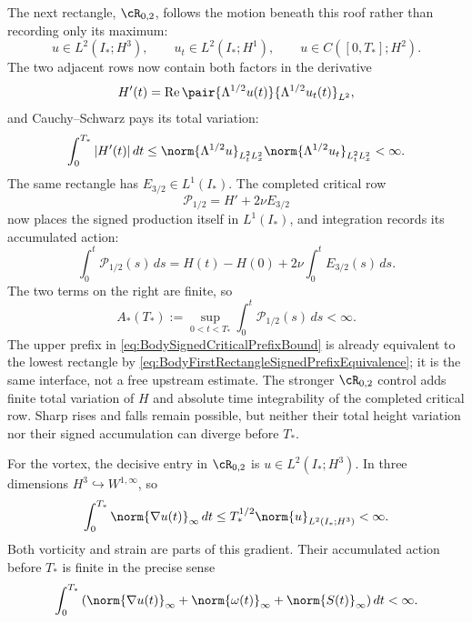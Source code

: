 The next rectangle, \(\cR_{0,2}\), follows the motion beneath this roof rather
than recording only its maximum:
\begin{equation}\label{eq:LowRectangleZeroTwo}
  u\in L^2(I_*;H^3),
  \qquad
  u_t\in L^2(I_*;H^1),
  \qquad
  u\in C([0,T_*];H^2).
\end{equation}
The two adjacent rows now contain both factors in the derivative
\[
  H'(t)
  =\operatorname{Re}
  \pair{\Lambda^{1/2}u(t)}{\Lambda^{1/2}u_t(t)}_{L^2},
\]
and Cauchy--Schwarz pays its total variation:
\begin{equation}\label{eq:CriticalHeightTotalVariationBound}
  \int_0^{T_*}|H'(t)|\,dt
  \leq
  \norm{\Lambda^{1/2}u}_{L^2_tL^2_x}
  \norm{\Lambda^{1/2}u_t}_{L^2_tL^2_x}
  <\infty.
\end{equation}
The same rectangle has \(E_{3/2}\in L^1(I_*)\).  The completed critical row
\[
  \mathcal P_{1/2}=H'+2\nu E_{3/2}
\]
now places the signed production itself in \(L^1(I_*)\), and integration
records its accumulated action:
\begin{equation}\label{eq:BodySignedCriticalPrefix}
  \int_0^t\mathcal P_{1/2}(s)\,ds
  =H(t)-H(0)+2\nu\int_0^tE_{3/2}(s)\,ds.
\end{equation}
The two terms on the right are finite, so
\begin{equation}\label{eq:BodySignedCriticalPrefixBound}
  A_*(T_*)
  :=\sup_{0<t<T_*}\int_0^t\mathcal P_{1/2}(s)\,ds
  <\infty.
\end{equation}
The upper prefix in \eqref{eq:BodySignedCriticalPrefixBound} is already
equivalent to the lowest rectangle by
\eqref{eq:BodyFirstRectangleSignedPrefixEquivalence}; it is the same interface,
not a free upstream estimate.  The stronger \(\cR_{0,2}\) control adds finite
total variation of \(H\) and absolute time integrability of the completed
critical row.  Sharp rises and falls remain possible, but neither their total
height variation nor their signed accumulation can diverge before \(T_*\).

For the vortex, the decisive entry in \(\cR_{0,2}\) is
\(u\in L^2(I_*;H^3)\).  In three dimensions
\(H^3\hookrightarrow W^{1,\infty}\), so
\[
  \int_0^{T_*}\norm{\nabla u(t)}_\infty\,dt
  \leq
  T_*^{1/2}\norm{u}_{L^2(I_*;H^3)}<\infty.
\]
Both vorticity and strain are parts of this gradient.  Their accumulated action
before \(T_*\) is finite in the precise sense
\begin{equation}\label{eq:FiniteLipschitzVorticityStrainAction}
  \int_0^{T_*}
  \left(
    \norm{\nabla u(t)}_\infty
    +\norm{\omega(t)}_\infty
    +\norm{S(t)}_\infty
  \right)dt
  <\infty.
\end{equation}

